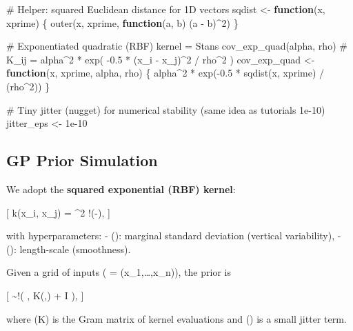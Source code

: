 \documentclass[
  letterpaper,
  DIV=11,
  numbers=noendperiod]{scrartcl}
\newenvironment{Shaded}{\begin{snugshade}}{\end{snugshade}}
\newcommand{\CommentTok}[1]{\textcolor[rgb]{0.37,0.37,0.37}{#1}}
\newcommand{\ControlFlowTok}[1]{\textcolor[rgb]{0.00,0.23,0.31}{\textbf{#1}}}
\newcommand{\DecValTok}[1]{\textcolor[rgb]{0.68,0.00,0.00}{#1}}
\newcommand{\FloatTok}[1]{\textcolor[rgb]{0.68,0.00,0.00}{#1}}
\newcommand{\FunctionTok}[1]{\textcolor[rgb]{0.28,0.35,0.67}{#1}}
\newcommand{\NormalTok}[1]{\textcolor[rgb]{0.00,0.23,0.31}{#1}}
\newcommand{\OtherTok}[1]{\textcolor[rgb]{0.00,0.23,0.31}{#1}}
\newcommand{\SpecialCharTok}[1]{\textcolor[rgb]{0.37,0.37,0.37}{#1}}
\begin{document}
\begin{Shaded}
\begin{Highlighting}[]
\CommentTok{\# Helper: squared Euclidean distance for 1D vectors}
\NormalTok{sqdist }\OtherTok{\textless{}{-}} \ControlFlowTok{function}\NormalTok{(x, xprime) \{}
  \FunctionTok{outer}\NormalTok{(x, xprime, }\ControlFlowTok{function}\NormalTok{(a, b) (a }\SpecialCharTok{{-}}\NormalTok{ b)}\SpecialCharTok{\^{}}\DecValTok{2}\NormalTok{)}
\NormalTok{\}}

\CommentTok{\# Exponentiated quadratic (RBF) kernel = Stan\textquotesingle{}s cov\_exp\_quad(alpha, rho)}
\CommentTok{\# K\_ij = alpha\^{}2 * exp( {-}0.5 * (x\_i {-} x\_j)\^{}2 / rho\^{}2 )}
\NormalTok{cov\_exp\_quad }\OtherTok{\textless{}{-}} \ControlFlowTok{function}\NormalTok{(x, xprime, alpha, rho) \{}
\NormalTok{  alpha}\SpecialCharTok{\^{}}\DecValTok{2} \SpecialCharTok{*} \FunctionTok{exp}\NormalTok{(}\SpecialCharTok{{-}}\FloatTok{0.5} \SpecialCharTok{*} \FunctionTok{sqdist}\NormalTok{(x, xprime) }\SpecialCharTok{/}\NormalTok{ (rho}\SpecialCharTok{\^{}}\DecValTok{2}\NormalTok{))}
\NormalTok{\}}

\CommentTok{\# Tiny jitter (nugget) for numerical stability (same idea as tutorial\textquotesingle{}s 1e{-}10)}
\NormalTok{jitter\_eps }\OtherTok{\textless{}{-}} \FloatTok{1e{-}10}
\end{Highlighting}
\end{Shaded}

\subsection{GP Prior Simulation}\label{gp-prior-simulation}

We adopt the \textbf{squared exponential (RBF) kernel}:

{[} k(x\_i, x\_j) = \alpha\^{}2
\exp!\left(-\right), {]}

with hyperparameters: - (\alpha): marginal standard deviation (vertical
variability), - (\rho): length-scale (smoothness).

Given a grid of inputs ( = (x\_1,\dots,x\_n)), the prior is

{[}  \sim {}!\big( ,
K(,) + \epsilon I \big), {]}

where (K) is the Gram matrix of kernel evaluations and (\epsilon) is a
small jitter term.
\end{document}
